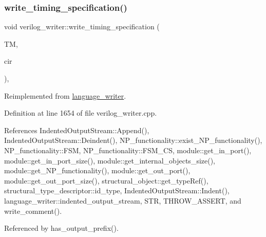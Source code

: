 \subsubsection{\texorpdfstring{write\+\_\+timing\+\_\+specification()}{write\_timing\_specification()}}
{\footnotesize\ttfamily void verilog\+\_\+writer\+::write\+\_\+timing\+\_\+specification (\begin{DoxyParamCaption}\item[{const technology\+\_\+manager\+Const\+Ref}]{TM,  }\item[{const \hyperlink{structural__objects_8hpp_a8ea5f8cc50ab8f4c31e2751074ff60b2}{structural\+\_\+object\+Ref} \&}]{cir }\end{DoxyParamCaption})\hspace{0.3cm}{\ttfamily [override]}, {\ttfamily [virtual]}}



Reimplemented from \hyperlink{classlanguage__writer_acbb595dd221844492946d60b79c00185}{language\+\_\+writer}.



Definition at line 1654 of file verilog\+\_\+writer.\+cpp.



References Indented\+Output\+Stream\+::\+Append(), Indented\+Output\+Stream\+::\+Deindent(), N\+P\+\_\+functionality\+::exist\+\_\+\+N\+P\+\_\+functionality(), N\+P\+\_\+functionality\+::\+F\+SM, N\+P\+\_\+functionality\+::\+F\+S\+M\+\_\+\+CS, module\+::get\+\_\+in\+\_\+port(), module\+::get\+\_\+in\+\_\+port\+\_\+size(), module\+::get\+\_\+internal\+\_\+objects\+\_\+size(), module\+::get\+\_\+\+N\+P\+\_\+functionality(), module\+::get\+\_\+out\+\_\+port(), module\+::get\+\_\+out\+\_\+port\+\_\+size(), structural\+\_\+object\+::get\+\_\+type\+Ref(), structural\+\_\+type\+\_\+descriptor\+::id\+\_\+type, Indented\+Output\+Stream\+::\+Indent(), language\+\_\+writer\+::indented\+\_\+output\+\_\+stream, S\+TR, T\+H\+R\+O\+W\+\_\+\+A\+S\+S\+E\+RT, and write\+\_\+comment().



Referenced by has\+\_\+output\+\_\+prefix().

